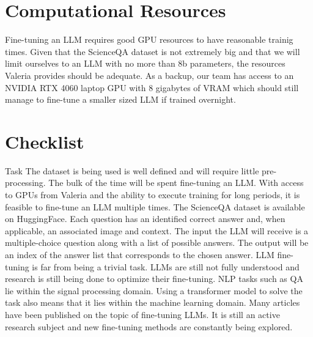 \documentclass[11pt]{article} %
\begin{document}
\section*{Computational Resources}
Fine-tuning an LLM requires good GPU resources to have reasonable trainig times. Given that the ScienceQA dataset is not extremely big and that we will limit ourselves to an LLM with no more than 8b parameters, the resources Valeria provides should be adequate. As a backup, our team has access to an NVIDIA RTX 4060 laptop GPU with 8 gigabytes of VRAM which should still manage to fine-tune a smaller sized LLM if trained overnight. 

\section*{Checklist}
\begin{CheckList}{Task}
     The dataset is being used is well defined and will require little pre-processing. The bulk of the time will be spent fine-tuning an LLM. With access to GPUs from Valeria and the ability to execute training for long periods, it is feasible to fine-tune an LLM multiple times.
     The ScienceQA dataset is available on HuggingFace. Each question has an identified correct answer and, when applicable, an associated image and context.
     The input the LLM will receive is a multiple-choice question along with a list of possible answers. The output will be an index of the answer list that corresponds to the chosen answer.
     LLM fine-tuning is far from being a trivial task. LLMs are still not fully understood and research is still being done to optimize their fine-tuning. 
     NLP tasks such as QA lie within the signal processing domain. Using a transformer model to solve the task also means that it lies within the machine learning domain.
     Many articles have been published on the topic of fine-tuning LLMs. It is still an active research subject and new fine-tuning methods are constantly being explored.
\end{CheckList}

\medskip
\printbibliography
\end{document}
